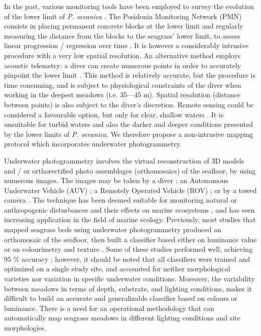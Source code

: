 In the past, various monitoring tools have been employed to survey the evolution of the lower limit of \textit{P. oceanica} \citep{noel_cahier_2012}. The Posidonia Monitoring Network (PMN) consists in placing permanent concrete blocks at the lower limit and regularly measuring the distance from the blocks to the seagrass’ lower limit, to assess linear progression / regression over time \citep{boudouresque_monitoring_2007, pergent_protocole_2007}. It is however a considerably intrusive procedure with a very low spatial resolution. An alternative method employs acoustic telemetry: a diver can create numerous points in order to accurately pinpoint the lower limit \citep{descamp_underwater_2005, descamp_fast_2011}. This method is relatively accurate, but the procedure is time consuming, and is subject to physiological constraints of the diver when working in the deepest meadows (i.e. 35---45 m). Spatial resolution (distance between points) is also subject to the diver’s discretion. Remote sensing could be considered a favourable option, but only for clear, shallow waters \citep{koedsin_integrated_2016, pu_mapping_2017, topouzelis_seagrass_2018, traganos_mapping_2018}. It is unsuitable for turbid waters and also the darker and deeper conditions presented by the lower limits of \textit{P. oceanica}. We therefore propose a non-intrusive mapping protocol which incorporates underwater photogrammetry.

Underwater photogrammetry involves the virtual reconstruction of 3D models and / or orthorectified photo assemblages (orthomosaics) of the seafloor, by using numerous images. The images may be taken by a diver \citep{mizuno_simple_2017}; an Autonomous Underwater Vehicle (AUV) \citep{bryson_automated_2013, bonin-font_towards_2016}; a Remotely Operated Vehicle (ROV) \citep{drap_rov_2015}; or by a towed camera \citep{rende_advances_2015}. The technique has been deemed suitable for monitoring natural or anthropogenic disturbances and their effects on marine ecosystems \citep{burns_assessing_2016}, and has seen increasing application in the field of marine ecology. Previously, most studies that mapped seagrass beds using underwater photogrammetry produced an orthomosaic of the seafloor, then built a classifier based either on luminance value \citep{mizuno_simple_2017} or on colourimetry and texture \citep{rende_advances_2015, bonin-font_towards_2016}. Some of these studies performed well, achieving 95 \% accuracy \citep{bonin-font_towards_2016}; however, it should be noted that all classifiers were trained and optimized on a single study site, and accounted for neither morphological varieties nor variation in specific underwater conditions. Moreover, the variability between meadows in terms of depth, substrate, and lighting conditions, makes it difficult to build an accurate and generalizable classifier based on colours or luminance. There is a need for an operational methodology that can automatically map seagrass meadows in different lighting conditions and site morphologies.

